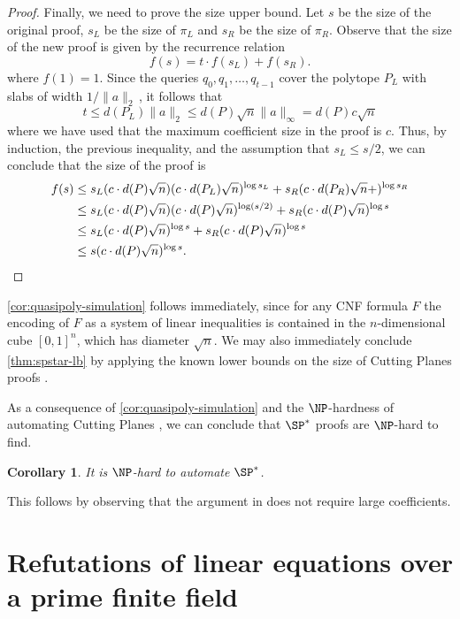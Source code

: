 \documentclass[11pt]{article}
\numberwithin{equation}{section}
\newtheorem{corollary}[theorem]{Corollary}
\theoremstyle{definition}
\theoremstyle{plain}
\newcounter{cor}\renewcommand{\thecor}{1.1.\arabic{cor}}\newenvironment{cor}{\ifnum\value{cor}=0\refstepcounter{cor}\else\PackageError{toc-native-compat}{Unsupported additional cor envelope}{Only the one exact source-observed cor paragraph is allowed.}\fi}{}\providecommand{\corautorefname}{Theorem}
\begin{document}
\begin{proof}
	Finally, we need to prove the size upper bound. Let $s$ be the size of the original proof, $s_L$ be the size of $\pi_L$ and $s_R$ be the size of $\pi_R$. Observe that the size of the new proof is given by the recurrence relation
	\[ f(s) = t \cdot f(s_L)+f(s_R). \] 
	where $f(1) = 1$. Since the queries $q_0,q_1,\ldots, q_{t-1}$ cover the polytope $P_L$ with slabs of width $1/\|a\|_2\,$, it follows that
	\[ t \leq d(P_L) \|a\|_2 \leq d(P) \sqrt{n} \|a\|_\infty =d(P)c \sqrt{n} \]
	where we have used that the maximum coefficient size in the proof is $c$. Thus, by induction, the previous inequality, and the assumption that $s_L \leq s/2$, we can conclude that the size of the proof is
	\begin{align*}
		f(s) &\leq s_L(c \cdot d(P) \sqrt{n})(c \cdot d(P_L) \sqrt{n})^{\log s_L} + s_R(c \cdot d(P_R) \sqrt{n} +)^{\log s_R} \\
		&\leq s_L(c \cdot d(P) \sqrt{n})(c \cdot d(P) \sqrt{n})^{\log (s/2)} + s_R(c \cdot d(P) \sqrt{n} )^{\log s}\\
		&\leq s_L(c \cdot d(P) \sqrt{n})^{\log s} + s_R(c \cdot d(P) \sqrt{n})^{\log s} \\
		&\leq s(c \cdot d(P) \sqrt{n})^{\log s}. \qedhere
	\end{align*}
\end{proof}

\autoref{cor:quasipoly-simulation} follows immediately, since for any CNF formula $F$ the encoding of $F$ as a system of linear inequalities is contained in the $n$-dimensional cube $[0,1]^n$, which has diameter $\sqrt{n}$. 
We may also immediately conclude \autoref{thm:spstar-lb} by applying the known lower bounds on the size of Cutting Planes proofs \cite{Pudlak97,FlemingPPR17,HrubesP17,GargGKS18}. 

As a consequence of \autoref{cor:quasipoly-simulation} and the
%
$\NP$-hardness of automating %
Cutting Planes \cite{GoosKMP20}, we can conclude that $\SP^*$ proofs
%
%
%
%
%
are $\NP$-hard to find.   %
%

\begin{corollary}
\label{cor:non-automatability} 
%
%
It is $\NP$-hard to automate $\SP^*$.   %
%
\end{corollary}
This follows by observing that the argument in \cite{GoosKMP20} does not
require large coefficients.








\section{Refutations of linear equations over a prime finite field}\label{sec:qpSPref}
\end{document}
